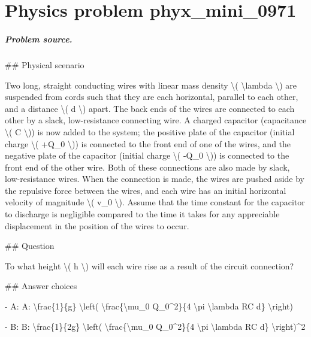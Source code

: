 
\chapter{Physics problem phyx\_mini\_0971}
\label{ch:PhyXMiniProblems_problem_phyx_mini_0971}

\paragraph{Problem source.}
\#\# Physical scenario

Two long, straight conducting wires with linear mass density \textbackslash{}( \textbackslash{}lambda \textbackslash{}) are suspended from cords such that they are each horizontal, parallel to each other, and a distance \textbackslash{}( d \textbackslash{}) apart. The back ends of the wires are connected to each other by a slack, low-resistance connecting wire. A charged capacitor (capacitance \textbackslash{}( C \textbackslash{})) is now added to the system; the positive plate of the capacitor (initial charge \textbackslash{}( +Q\_0 \textbackslash{})) is connected to the front end of one of the wires, and the negative plate of the capacitor (initial charge \textbackslash{}( -Q\_0 \textbackslash{})) is connected to the front end of the other wire. Both of these connections are also made by slack, low-resistance wires. When the connection is made, the wires are pushed aside by the repulsive force between the wires, and each wire has an initial horizontal velocity of magnitude \textbackslash{}( v\_0 \textbackslash{}). Assume that the time constant for the capacitor to discharge is negligible compared to the time it takes for any appreciable displacement in the position of the wires to occur.

\#\# Question

To what height \textbackslash{}( h \textbackslash{}) will each wire rise as a result of the circuit connection?

\#\# Answer choices

- A: A: \textbackslash{}frac\{1\}\{g\} \textbackslash{}left( \textbackslash{}frac\{\textbackslash{}mu\_0 Q\_0\textasciicircum{}2\}\{4 \textbackslash{}pi \textbackslash{}lambda RC d\} \textbackslash{}right)

- B: B: \textbackslash{}frac\{1\}\{2g\} \textbackslash{}left( \textbackslash{}frac\{\textbackslash{}mu\_0 Q\_0\textasciicircum{}2\}\{4 \textbackslash{}pi \textbackslash{}lambda RC d\} \textbackslash{}right)\textasciicircum{}2

